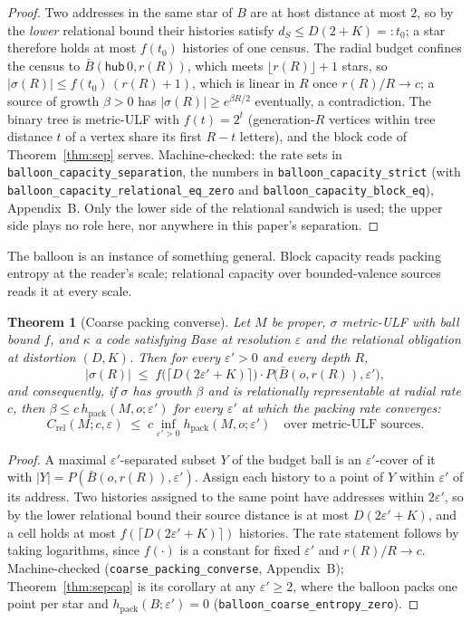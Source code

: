 \documentclass[11pt,reqno]{amsart}
\theoremstyle{plain}
\newtheorem{theorem}{Theorem}[section]
\theoremstyle{definition}
\newcommand{\hpack}{h_{\mathrm{pack}}}
\newcommand{\Crel}{C_{\mathrm{rel}}}
\newcommand{\eps}{\varepsilon}
\begin{document}
\begin{proof}
Two addresses in the same star of $B$ are at host distance at most $2$, so by the \emph{lower} relational bound their histories satisfy $d_S\le D(2+K)=:t_0$; a star therefore holds at most $f(t_0)$ histories of one census. The radial budget confines the census to $\bar B(\mathsf{hub}\,0,r(R))$, which meets $\lfloor r(R)\rfloor+1$ stars, so $|\sigma(R)|\le f(t_0)\,(r(R)+1)$, which is linear in $R$ once $r(R)/R\to c$; a source of growth $\beta>0$ has $|\sigma(R)|\ge e^{\beta R/2}$ eventually, a contradiction. The binary tree is metric-ULF with $f(t)=2^t$ (generation-$R$ vertices within tree distance $t$ of a vertex share its first $R-t$ letters), and the block code of Theorem~\ref{thm:sep} serves. Machine-checked: the rate sets in \texttt{balloon\_\allowbreak{}capacity\_\allowbreak{}separation}, the numbers in \texttt{balloon\_\allowbreak{}capacity\_\allowbreak{}strict} (with \texttt{balloon\_\allowbreak{}capacity\_\allowbreak{}relational\_\allowbreak{}eq\_\allowbreak{}zero} and \texttt{balloon\_\allowbreak{}capacity\_\allowbreak{}block\_\allowbreak{}eq}), Appendix~B. Only the lower side of the relational sandwich is used; the upper side plays no role here, nor anywhere in this paper's separation.
\end{proof}

The balloon is an instance of something general. Block capacity reads packing entropy at the reader's scale; relational capacity over bounded-valence sources reads it at every scale.

\begin{theorem}[Coarse packing converse]\label{thm:coarse}
Let $M$ be proper, $\sigma$ metric-ULF with ball bound $f$, and $\kappa$ a code satisfying Base at resolution $\eps$ and the relational obligation at distortion $(D,K)$. Then for every $\eps'>0$ and every depth $R$,
\[
|\sigma(R)|\;\le\;f\bigl(\lceil D(2\eps'+K)\rceil\bigr)\cdot P\bigl(\bar B(o,r(R)),\eps'\bigr),
\]
and consequently, if $\sigma$ has growth $\beta$ and is relationally representable at radial rate $c$, then $\beta\le c\,\hpack(M,o;\eps')$ for every $\eps'$ at which the packing rate converges:
\[
\Crel(M;c,\eps)\;\le\;c\inf_{\eps'>0}\hpack(M,o;\eps')\quad\text{over metric-ULF sources.}
\]
\end{theorem}

\begin{proof}
A maximal $\eps'$-separated subset $Y$ of the budget ball is an $\eps'$-cover of it with $|Y|=P(\bar B(o,r(R)),\eps')$. Assign each history to a point of $Y$ within $\eps'$ of its address. Two histories assigned to the same point have addresses within $2\eps'$, so by the lower relational bound their source distance is at most $D(2\eps'+K)$, and a cell holds at most $f(\lceil D(2\eps'+K)\rceil)$ histories. The rate statement follows by taking logarithms, since $f(\cdot)$ is a constant for fixed $\eps'$ and $r(R)/R\to c$. Machine-checked (\texttt{coarse\_\allowbreak{}packing\_\allowbreak{}converse}, Appendix~B); Theorem~\ref{thm:sepcap} is its corollary at any $\eps'\ge2$, where the balloon packs one point per star and $\hpack(B;\eps')=0$ (\texttt{balloon\_\allowbreak{}coarse\_\allowbreak{}entropy\_\allowbreak{}zero}).
\end{proof}
\end{document}
